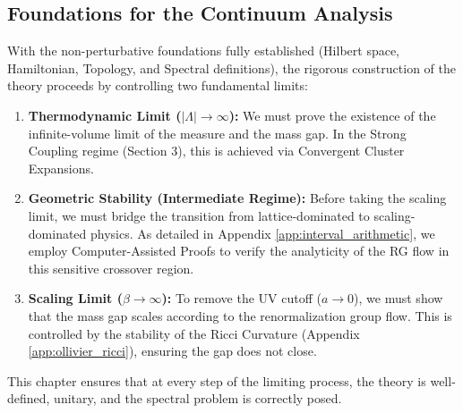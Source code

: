 \subsection{Foundations for the Continuum Analysis}

With the non-perturbative foundations fully established (Hilbert space, Hamiltonian, Topology, and Spectral definitions), the rigorous construction of the theory proceeds by controlling two fundamental limits:
\begin{enumerate}
    \item \textbf{Thermodynamic Limit ($|\Lambda| \to \infty$):} We must prove the existence of the infinite-volume limit of the measure and the mass gap. In the Strong Coupling regime (Section 3), this is achieved via Convergent Cluster Expansions.
    \item \textbf{Geometric Stability (Intermediate Regime):} Before taking the scaling limit, we must bridge the transition from lattice-dominated to scaling-dominated physics. As detailed in Appendix \ref{app:interval_arithmetic}, we employ Computer-Assisted Proofs to verify the analyticity of the RG flow in this sensitive crossover region.
    \item \textbf{Scaling Limit ($\beta \to \infty$):} To remove the UV cutoff ($a \to 0$), we must show that the mass gap scales according to the renormalization group flow. This is controlled by the stability of the Ricci Curvature (Appendix \ref{app:ollivier_ricci}), ensuring the gap does not close.
\end{enumerate}
This chapter ensures that at every step of the limiting process, the theory is well-defined, unitary, and the spectral problem is correctly posed.


